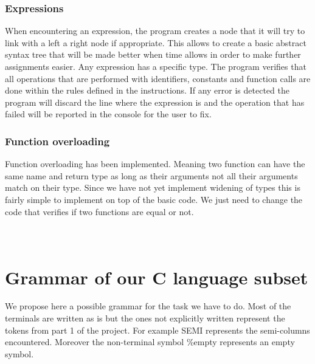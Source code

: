 \documentclass{article}
\begin{document}
\subsubsection{Expressions}
When encountering an expression, the program creates a node that it will try to link with a left a right node if appropriate. This allows to create a basic abstract syntax tree that will be made better when time allows in order to make further assignments easier. 
Any expression has a specific type. The program verifies that all operations that are performed with identifiers, constants and function calls are done within the rules defined in the instructions. 
If any error is detected the program will discard the line where the expression is and the operation that has failed will be reported in the console for the user to fix. 

\subsubsection{Function overloading}
Function overloading has been implemented. Meaning two function can have the same name and return type as long as their arguments not all their arguments match on their type. Since we have not yet implement widening of types this is fairly simple to implement on top of the basic code. We just need to change the code that verifies if two functions are equal or not. 


























\appendix
\section{\\Grammar of our C language subset}
\label{grammar}
We propose here a possible grammar for the task we have to do. Most of the terminals are written as is but the ones not explicitly written represent the tokens from part 1 of the project. For example {\sc SEMI} represents the semi-columns encountered. Moreover the non-terminal symbol {\%empty} represents an empty symbol. 
\end{document}
